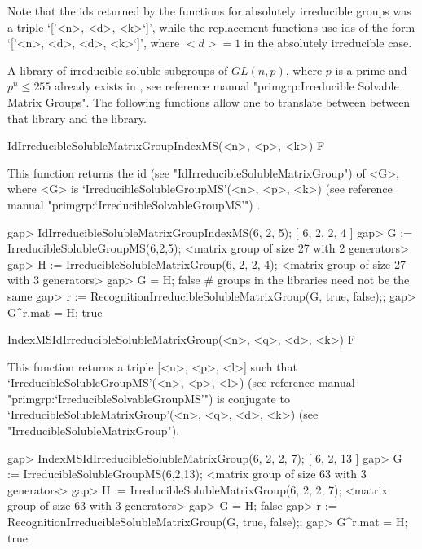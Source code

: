 Note that the ids returned by the functions for absolutely irreducible groups was a triple `['<n>, <d>, <k>`]', while the replacement functions use ids of the form `['<n>, <d>, <d>, <k>`]', where $<d> = 1$ in the absolutely irreducible case.


\null


A library of irreducible soluble subgroups of $GL(n, p)$, where $p$ is a 
prime and $p^n \leq 255$ already exists in {\GAP}, see {\PrimGrp} reference manual "primgrp:Irreducible Solvable Matrix Groups". The following functions
allow one to translate between between that library and the {\IRREDSOL} library. 


\>IdIrreducibleSolubleMatrixGroupIndexMS(<n>, <p>, <k>) F

This function returns the id (see "IdIrreducibleSolubleMatrixGroup") of <G>, 
where <G> is `IrreducibleSolubleGroupMS'(<n>, <p>, <k>) (see {\PrimGrp} reference manual "primgrp:`IrreducibleSolvableGroupMS'") .

\beginexample
gap> IdIrreducibleSolubleMatrixGroupIndexMS(6, 2, 5);
[ 6, 2, 2, 4 ]
gap> G := IrreducibleSolubleGroupMS(6,2,5);
<matrix group of size 27 with 2 generators>
gap> H := IrreducibleSolubleMatrixGroup(6, 2, 2, 4);
<matrix group of size 27 with 3 generators>
gap> G = H;
false 
# groups in the libraries need not be the same
gap> r := RecognitionIrreducibleSolubleMatrixGroup(G, true, false);;
gap> G^r.mat = H;
true
\endexample

\>IndexMSIdIrreducibleSolubleMatrixGroup(<n>, <q>, <d>, <k>) F

This function returns a triple [<n>, <p>, <l>] such that
`IrreducibleSolubleGroupMS'(<n>, <p>, <l>) (see {\PrimGrp}  reference manual  "primgrp:`IrreducibleSolvableGroupMS'") is conjugate to
`IrreducibleSolubleMatrixGroup'(<n>, <q>, <d>, <k>) (see "IrreducibleSolubleMatrixGroup").

\beginexample
gap> IndexMSIdIrreducibleSolubleMatrixGroup(6, 2, 2, 7);
[ 6, 2, 13 ]
gap> G := IrreducibleSolubleGroupMS(6,2,13);
<matrix group of size 63 with 3 generators>
gap> H := IrreducibleSolubleMatrixGroup(6, 2, 2, 7);
<matrix group of size 63 with 3 generators>
gap> G = H;
false 
gap> r := RecognitionIrreducibleSolubleMatrixGroup(G, true, false);;
gap> G^r.mat = H;
true
\endexample


\null


